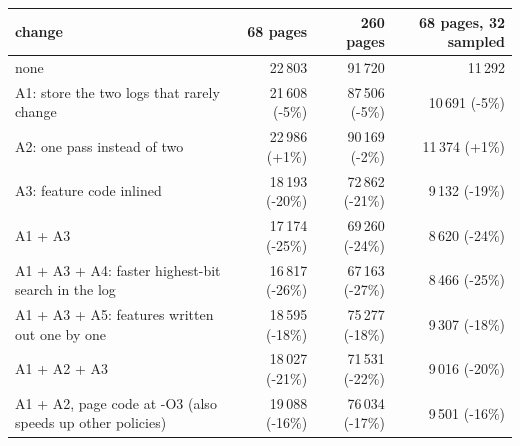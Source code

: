 \begin{tabular}{lrrr}
\toprule
change & 68 pages & 260 pages & 68 pages, 32 sampled \\
\midrule
none & 22\,803 & 91\,720 & 11\,292 \\
A1: store the two logs that rarely change & 21\,608 (-5\%) & 87\,506 (-5\%) & 10\,691 (-5\%) \\
A2: one pass instead of two & 22\,986 (+1\%) & 90\,169 (-2\%) & 11\,374 (+1\%) \\
A3: feature code inlined & 18\,193 (-20\%) & 72\,862 (-21\%) & 9\,132 (-19\%) \\
A1 + A3 & 17\,174 (-25\%) & 69\,260 (-24\%) & 8\,620 (-24\%) \\
A1 + A3 + A4: faster highest-bit search in the log & 16\,817 (-26\%) & 67\,163 (-27\%) & 8\,466 (-25\%) \\
A1 + A3 + A5: features written out one by one & 18\,595 (-18\%) & 75\,277 (-18\%) & 9\,307 (-18\%) \\
A1 + A2 + A3 & 18\,027 (-21\%) & 71\,531 (-22\%) & 9\,016 (-20\%) \\
A1 + A2, page code at -O3 (also speeds up other policies) & 19\,088 (-16\%) & 76\,034 (-17\%) & 9\,501 (-16\%) \\
\bottomrule
\end{tabular}
